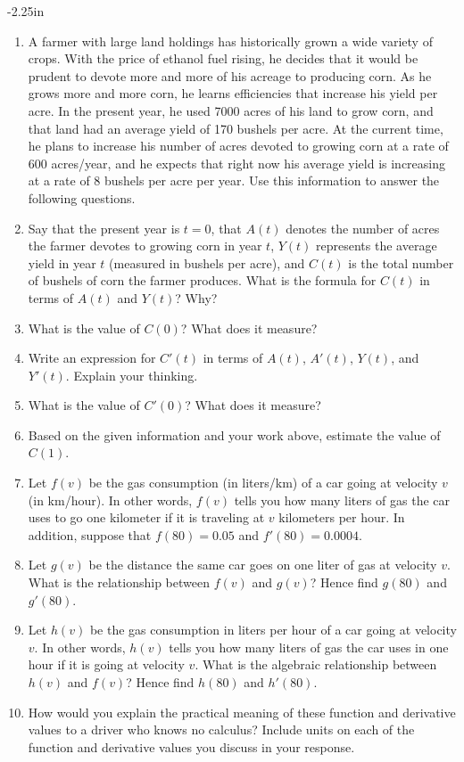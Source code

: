 \begin{adjustwidth*}{}{-2.25in}
\begin{multicols*}{2}
\begin{enumerate}[1),start=40]
\item A farmer with large land holdings has historically grown a wide variety of crops.  With the price of ethanol fuel rising, he decides that it would be prudent to devote more and more of his acreage to producing corn.  As he grows more and more corn, he learns efficiencies that increase his yield per acre.  In the present year, he used 7000 acres of his land to grow corn, and that land had an average yield of 170 bushels per acre.  At the current time, he plans to increase his number of acres devoted to growing corn at a rate of 600 acres/year, and he expects that right now his average yield is increasing at a rate of 8 bushels per acre per year.  Use this information to answer the following questions.
\ba
	\item Say that the present year is $t = 0$, that $A(t)$ denotes the number of acres the farmer devotes to growing corn in year $t$, $Y(t)$ represents the average yield in year $t$ (measured in bushels per acre), and $C(t)$ is the total number of bushels of corn the farmer produces.  What is the formula for $C(t)$ in terms of $A(t)$ and $Y(t)$?  Why?
	\item What is the value of $C(0)$?  What does it measure?
	\item Write an expression for $C'(t)$ in terms of $A(t)$, $A'(t)$, $Y(t)$, and $Y'(t)$.  Explain your thinking.
	\item What is the value of $C'(0)$?  What does it measure?
	\item Based on the given information and your work above, estimate the value of $C(1)$.	
\ea

\item Let $f(v)$ be the gas consumption (in liters/km) of a car going at velocity $v$ (in km/hour). In other words, $f(v)$ tells you how many liters of gas the car uses to go one  kilometer if it is traveling at $v$ kilometers per hour. In addition, suppose that $f(80)=0.05$ and $f'(80) = 0.0004$.
\ba
	\item Let $g(v)$ be the distance the same car goes on one liter of gas at velocity $v$.  What is the relationship between $f(v)$ and $g(v)$? Hence find $g(80)$ and $g'(80)$.
      	\item Let $h(v)$ be the gas consumption in liters per hour of a car going at velocity $v$. In other words, $h(v)$ tells you how many liters of gas the car uses in one hour if it is going at velocity $v$.   What is the algebraic relationship between $h(v)$ and $f(v)$?  Hence find $h(80)$ and $h'(80)$.     
	\item How would you explain the practical meaning of these function and derivative values to a driver who knows no calculus?  Include units on each of the function and derivative values you discuss in your response.  
\ea


\end{enumerate}
\end{multicols*}
\end{adjustwidth*}
